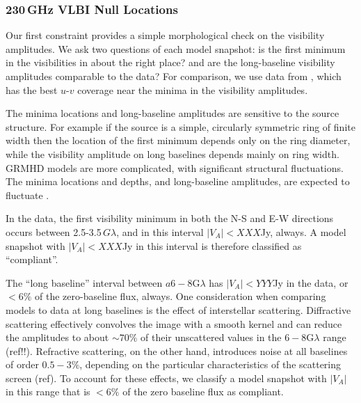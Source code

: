 \subsubsection{230\,GHz VLBI Null Locations}


Our first constraint provides a simple morphological check on the visibility amplitudes.  We ask two questions of each model snapshot: is the first minimum in the visibilities in about the right place?  and are the long-baseline visibility amplitudes comparable to the data?  For comparison, we use data from \aprilvii, which has the best $u$-$v$ coverage near the minima in the visibility amplitudes.

The minima locations and long-baseline amplitudes are sensitive to the source structure.  For example if the source is a simple, circularly symmetric ring of finite width then the location of the first minimum depends only on the ring diameter, while the visibility amplitude on long baselines depends mainly on  ring width.  GRMHD models are more complicated, with significant structural fluctuations.  The minima locations and depths, and long-baseline amplitudes, are expected to fluctuate \citep[e.g.,]{2018ApJ...856..163M, M87PaperV}.

In the data, the first visibility minimum in both the N-S and E-W directions occurs between 2.5-3.5\,$G\lambda$, and in this interval $|V_A| < XXX$Jy, always.  A model snapshot with $|V_A| < XXX$Jy in this interval is therefore classified as ``compliant''.  

The ``long baseline'' interval between $a6-8$G$\lambda$ has $|V_A| < YYY$Jy in the data, or $ < 6\%$ of the zero-baseline flux, always.  One consideration when comparing models to data at long baselines is the effect of interstellar scattering.  Diffractive scattering effectively convolves the image with a smooth kernel and can reduce the amplitudes to about $\sim 70\%$ of their unscattered values in the $6-8$G$\lambda$ range (ref!!).  Refractive scattering, on the other hand, introduces noise at all baselines of order $0.5-3\%$, depending on the particular characteristics of the scattering screen (ref).  To account for these effects, we classify a model snapshot with $|V_A|$ in this range that is $< 6\%$ of the zero baseline flux as compliant.   

